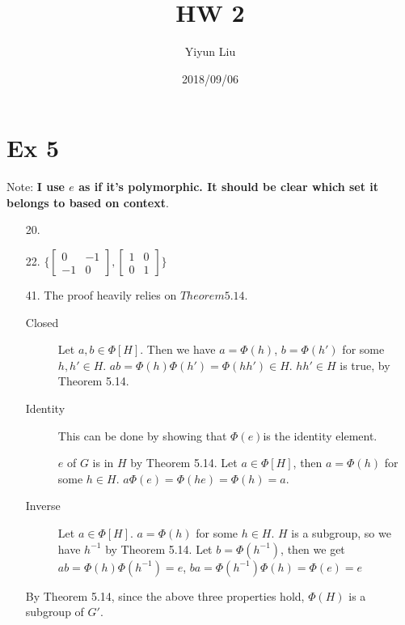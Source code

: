 \documentclass{article}
\title{HW 2}
\date{2018/09/06}
\author{Yiyun Liu}
\begin{document}
\maketitle
\lstset{basicstyle=\ttfamily}

\section*{Ex 5}
Note: \textbf{I use $e$ as if it's polymorphic. It should be clear which set it
belongs to based on context}.
\begin{itemize}
\item [20.]
\item [22.]
  $\{
  \begin{bmatrix}
    0 & -1 \\
    -1 & 0
  \end{bmatrix},
  \begin{bmatrix}
    1 & 0 \\
    0 & 1
  \end{bmatrix}
\}$
\item [41.]
  The proof heavily relies on $Theorem 5.14$.
  \begin{description}
  \item [Closed]
    Let $a,b \in \Phi[H]$. Then we have $a = \Phi(h)$, $b=\Phi(h')$
    for some $h,h' \in H$. $ab = \Phi(h)\Phi(h')=\Phi(hh') \in
    H$. $hh' \in H$ is true, by Theorem 5.14.
  \item [Identity]
        This can be done by showing that $\Phi(e)$is the identity
        element.

        $e$ of $G$ is in $H$ by Theorem 5.14.
        Let $a \in \Phi[H]$, then $a = \Phi(h)$ for some $h \in H$. $a
        \Phi(e) = \Phi(he) = \Phi(h) = a$.
  \item [Inverse]
    Let $a \in \Phi[H]$. $a=\Phi(h)$ for some $h\in H$. $H$ is a
    subgroup, so we have $h^{-1}$ by Theorem 5.14. Let $b=\Phi(h^{-1})$, then we get $ab
    = \Phi(h)\Phi(h^{-1}) = e$, $ba=\Phi(h^{-1})\Phi(h)=\Phi(e)=e$
  \end{description}
  By Theorem 5.14, since the above three properties hold, $\Phi(H)$ is
  a subgroup of $G'$.
\end{itemize}
\end{document}
